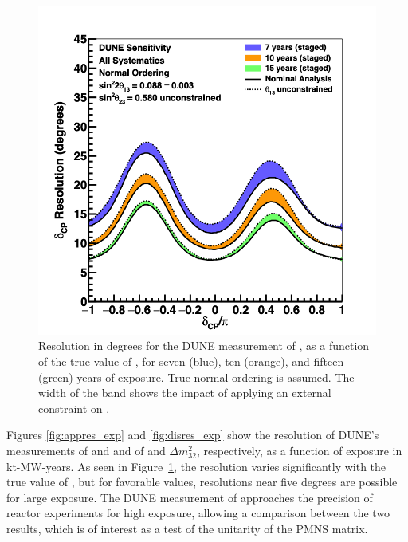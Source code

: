 \begin{figure}[h!]
    \centering
		\includegraphics[width=0.95\linewidth]{graphics/dcpresvdcp_smooth_v4.png}
	\caption[Resolution for the DUNE measurement of \deltacp as a function of \deltacp]
	{Resolution in degrees for the DUNE measurement of \deltacp, as a function of the true value of \deltacp, for seven (blue), ten (orange), and fifteen (green) years of exposure. True normal ordering is assumed. The width of the band shows the impact of applying an external constraint on .}
    \label{fig:dcpresvdcp}
\end{figure}

Figures \ref{fig:appres_exp} and  \ref{fig:disres_exp} show the resolution of DUNE's measurements of \deltacp and  and of  and $\Delta m^{2}_{32}$, respectively, as a function of exposure in kt-MW-years. As seen in Figure~\ref{fig:dcpresvdcp}, the \deltacp resolution varies significantly with the true value of \deltacp, but for favorable values, resolutions near five degrees are possible for large exposure. The DUNE measurement of  approaches the precision of reactor experiments for high exposure, allowing a comparison between the two results, which is of interest as a test of the unitarity of the PMNS matrix. 

